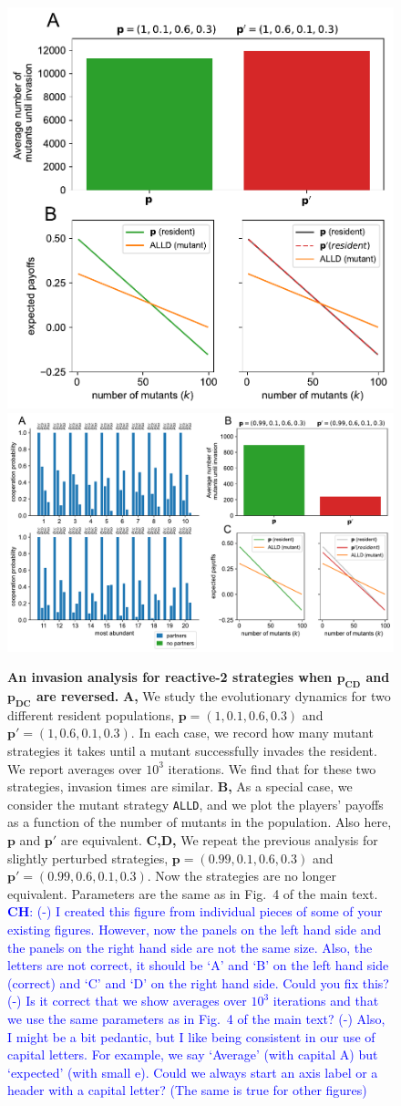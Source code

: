 \documentclass[9pt,twoside,lineno]{pnas-new}
\newcommand{\christian}[1]{\textcolor{blue}{\textbf{CH}: #1}}
\theoremstyle{plainCl1}
\theoremstyle{plainCl2}
\def\alld{\texttt{ALLD}}
\begin{document}
\begin{figure}[tbhp]
  \centering
  \includegraphics[width=.45\textwidth]{../../figures/siFigInvasionR2ForPCCone.pdf}
  \includegraphics[width=.397\textwidth]{../../figures/siFigInvasionR2_v2.pdf}
  \caption{\textbf{An invasion analysis for reactive-2 strategies when $\mathbf{p_{CD}}$ and $\mathbf{p_{DC}}$ are reversed.}
  \textbf{A,} We study the evolutionary dynamics for two different resident populations, $\mathbf{p}\!=\!(1,0.1,0.6,0.3)$ and $\mathbf{p'}\!=\!(1,0.6,0.1,0.3)$. 
  In each case, we record how many mutant strategies it takes until a mutant successfully invades the resident. 
  We report averages over $10^3$ iterations. We find that for these two strategies, invasion times are similar. 
  \textbf{B,} As a special case, we consider the mutant strategy \alld{}, and we plot the players' payoffs as a function of the number of mutants in the population. Also here, $\mathbf{p}$ and $\mathbf{p'}$ are equivalent. 
  \textbf{C,D,} We repeat the previous analysis for slightly perturbed strategies, $\mathbf{p}\!=\!(0.99,0.1,0.6,0.3)$ and $\mathbf{p'}\!=\!(0.99,0.6,0.1,0.3)$. Now the strategies are no longer equivalent. Parameters are the same as in Fig.~4 of the main text.\newline
  \christian{(-) I created this figure from individual pieces of some of your existing figures. However, now the panels on the left hand side and the panels on the right hand side are not the same size. Also, the letters are not correct, it should be `A' and `B' on the left hand side (correct) and `C' and `D' on the right hand side. Could you fix this? (-) Is it correct that we show averages over $10^3$ iterations and that we use the same parameters as in Fig.~4 of the main text? (-) Also, I might be a bit pedantic, but I like being consistent in our use of capital letters. For example, we say `Average' (with capital A) but `expected' (with small e). Could we always start an axis label or a header with a capital letter? (The same is true for other figures)}}\label{fig:InvasionAnalysisReactive2}

\end{figure}
\end{document}
